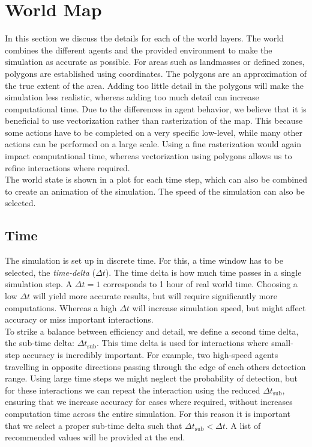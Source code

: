 \documentclass{article}
\begin{document}
\section{World Map}
In this section we discuss the details for each of the world layers. The world combines the different agents and the provided environment to make the simulation as accurate as possible. For areas such as landmasses or defined zones, polygons are established using coordinates. The polygons are an approximation of the true extent of the area. Adding too little detail in the polygons will make the simulation less realistic, whereas adding too much detail can increase computational time. Due to the differences in agent behavior, we believe that it is beneficial to use vectorization rather than rasterization of the map. This because some actions have to be completed on a very specific low-level, while many other actions can be performed on a large scale. Using a fine rasterization would again impact computational time, whereas vectorization using polygons allows us to refine interactions where required. \\

\noindent The world state is shown in a plot for each time step, which can also be combined to create an animation of the simulation. The speed of the simulation can also be selected. 

\subsection{Time}

The simulation is set up in discrete time. For this, a time window has to be selected, the \textit{time-delta} ($\Delta t$). The time delta is how much time passes in a single simulation step. A $\Delta t = 1$ corresponds to 1 hour of real world time. Choosing a low $\Delta t$ will yield more accurate results, but will require significantly more computations. Whereas a high $\Delta t$ will increase simulation speed, but might affect accuracy or miss important interactions. \\

\noindent To strike a balance between efficiency and detail, we define a second time delta, the sub-time delta: $\Delta t_{\text{sub}}$. This time delta is used for interactions where small-step accuracy is incredibly important. For example, two high-speed agents travelling in opposite directions passing through the edge of each others detection range. Using large time steps we might neglect the probability of detection, but for these interactions we can repeat the interaction using the reduced $\Delta t_{\text{sub}}$, ensuring that we increase accuracy for cases where required, without increases computation time across the entire simulation. For this reason it is important that we select a proper sub-time delta such that $\Delta t_{\text{sub}} < \Delta t$. A list of recommended values will be provided at the end.
\end{document}
